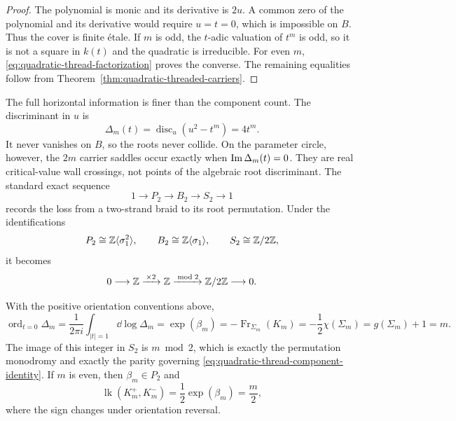 \begin{proof}
The polynomial is monic and its derivative is $2u$.  A common zero of the
polynomial and its derivative would require $u=t=0$, which is impossible on
$B$.  Thus the cover is finite \'etale.  If $m$ is odd, the $t$-adic valuation of
$t^m$ is odd, so it is not a square in $k(t)$ and the quadratic is irreducible.
For even $m$, \eqref{eq:quadratic-thread-factorization} proves the converse.
The remaining equalities follow from Theorem~\ref{thm:quadratic-threaded-carriers}.
\end{proof}

The full horizontal information is finer than the component count.  The
discriminant in $u$ is
\begin{equation}
 \Delta_m(t)=\operatorname{disc}_u(u^2-t^m)=4t^m.
 \label{eq:quadratic-thread-discriminant}
\end{equation}
It never vanishes on $B$, so the roots never collide.  On the parameter circle,
however, the $2m$ carrier saddles occur exactly when
$\operatorname{Im}\Delta_m(t)=0$.  They are real critical-value wall crossings, not points of
the algebraic root discriminant.
The standard exact sequence
\begin{equation}
 1\longrightarrow P_2\longrightarrow B_2
 \longrightarrow S_2\longrightarrow1
 \label{eq:two-braid-forgetting-exact-sequence}
\end{equation}
records the loss from a two-strand braid to its root permutation.  Under the
identifications
\begin{equation}
 P_2\cong\mathbb{Z}\langle\sigma_1^2\rangle,
 \qquad
 B_2\cong\mathbb{Z}\langle\sigma_1\rangle,
 \qquad
 S_2\cong\mathbb{Z}/2\mathbb{Z},
 \label{eq:two-braid-integer-identifications}
\end{equation}
it becomes
\begin{equation}
 0\longrightarrow\mathbb{Z}\xrightarrow{\,\times2\,}\mathbb{Z}
 \xrightarrow{\bmod 2}\mathbb{Z}/2\mathbb{Z}\longrightarrow0.
 \label{eq:two-braid-integer-exact-sequence}
\end{equation}

\begin{theorem}
\label{thm:threaded-carrier-identity}
With the positive orientation conventions above,
\begin{equation}
 \boxed{
 \operatorname{ord}_{t=0}\Delta_m
 =\frac{1}{2\pi i}\int_{|t|=1}\dd\log\Delta_m
 =\operatorname{exp}(\beta_m)
 =-\operatorname{Fr}_{\Sigma_m}(K_m)
 =-\frac12\chi(\Sigma_m)
 =g(\Sigma_m)+1
 =m.}
 \label{eq:threaded-carrier-main-identity}
\end{equation}
The image of this integer in $S_2$ is $m\bmod2$, which is exactly the
permutation monodromy and exactly the parity governing
\eqref{eq:quadratic-thread-component-identity}.  If $m$ is even, then
$\beta_m\in P_2$ and
\begin{equation}
 \operatorname{lk}(K_m^+,K_m^-)
 =\frac12\operatorname{exp}(\beta_m)
 =\frac m2,
 \label{eq:quadratic-thread-linking}
\end{equation}
where the sign changes under orientation reversal.
\end{theorem}

